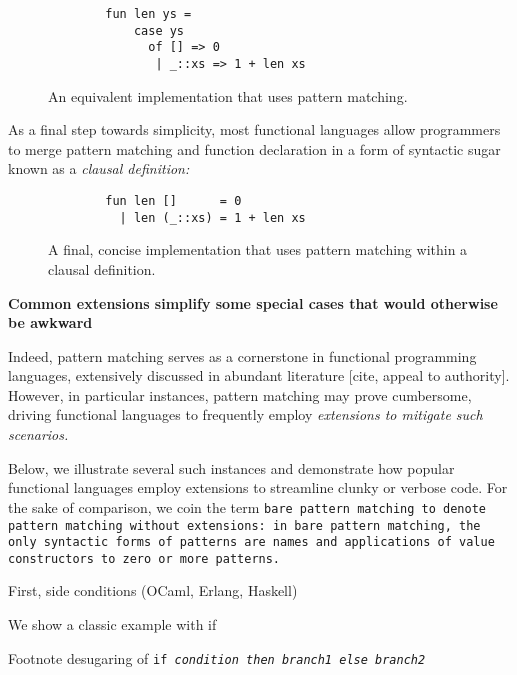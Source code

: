 \documentclass[manuscript,screen,review, 12pt]{acmart}
\begin{document}
\begin{outline}[enumerate]
\begin{figure}[htt]
    \smllst
    \begin{lstlisting}
        fun len ys =
            case ys 
              of [] => 0
               | _::xs => 1 + len xs
        \end{lstlisting}
    \caption{An equivalent implementation that uses pattern matching.}
    \label{fig:pmlen}
    \end{figure}

    As a final step towards simplicity, most functional languages allow
    programmers to merge pattern matching and function declaration in
    a form of syntactic sugar known as a \it{clausal definition}:

    \begin{figure}[ht]
    \smllst
    \begin{lstlisting}
        fun len []      = 0
          | len (_::xs) = 1 + len xs
        \end{lstlisting}
    \caption{A final, concise implementation that uses pattern matching within a clausal definition.}
    \label{fig:pmclausallen}
    \end{figure}
        

     \bf{Common extensions simplify some special cases that would otherwise be awkward}

    Indeed, pattern matching serves as a cornerstone in functional programming
    languages, extensively discussed in abundant literature [cite, appeal to
    authority]. However, in particular instances, pattern matching may prove
    cumbersome, driving functional languages to frequently employ
    \it{extensions} to mitigate such scenarios.
    
    Below, we illustrate several such instances and demonstrate how popular
    functional languages employ extensions to streamline clunky or verbose code.
    For the sake of comparison, we coin the term \tt{bare pattern matching} to
    denote pattern matching \tt{without} extensions: in bare pattern matching,
    the only syntactic forms of patterns are names and applications of value
    constructors to zero or more patterns. 


     First, side conditions (OCaml, Erlang, Haskell)

     We show a classic example with if 

     Footnote desugaring of \tt{if} \it{condition} \tt{then} \it{branch1} \tt{else} \it{branch2} 
    

\end{outline}
\end{document}
